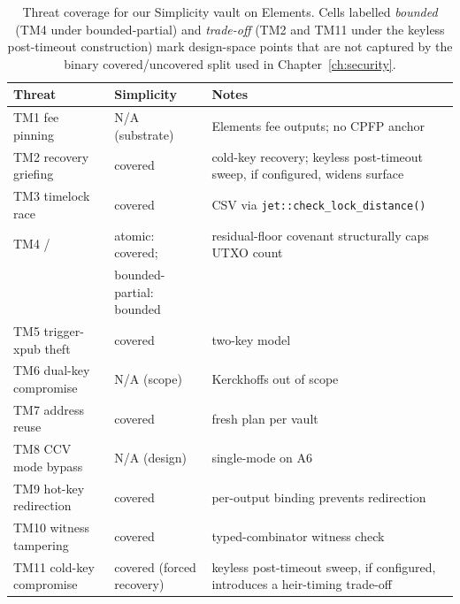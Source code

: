 \begin{table}[h]
\centering
\footnotesize
\begin{tabular}{@{}lll@{}}
\toprule
Threat & Simplicity & Notes \\
\midrule
TM1 fee pinning            & N/A (substrate)     & Elements fee outputs; no CPFP anchor                                         \\
TM2 recovery griefing      & covered             & cold-key recovery; keyless post-timeout sweep, if configured, widens surface \\
TM3 timelock race          & covered             & CSV via \texttt{jet::check\_lock\_distance()}                                \\
TM4 / \classscale{}        & atomic: covered;     & residual-floor covenant structurally caps UTXO count                        \\
                           & bounded-partial: bounded &                                                                         \\
TM5 trigger-xpub theft     & covered             & two-key model                                                                \\
TM6 dual-key compromise    & N/A (scope)         & Kerckhoffs out of scope                                                      \\
TM7 address reuse          & covered             & fresh plan per vault                                                         \\
TM8 CCV mode bypass        & N/A (design)        & single-mode on A6                                                            \\
TM9 hot-key redirection    & covered             & per-output binding prevents redirection                                      \\
TM10 witness tampering     & covered             & typed-combinator witness check                                               \\
TM11 cold-key compromise   & covered (forced recovery) & keyless post-timeout sweep, if configured, introduces a heir-timing trade-off \\
\bottomrule
\end{tabular}
\caption{Threat coverage for our Simplicity vault on Elements. Cells
labelled \emph{bounded} (TM4 under bounded-partial) and
\emph{trade-off} (TM2 and TM11 under the keyless post-timeout
construction) mark design-space points that are not captured by the
binary covered/uncovered split used in Chapter~\ref{ch:security}.}
\label{tab:simplicity-threats}
\end{table}

